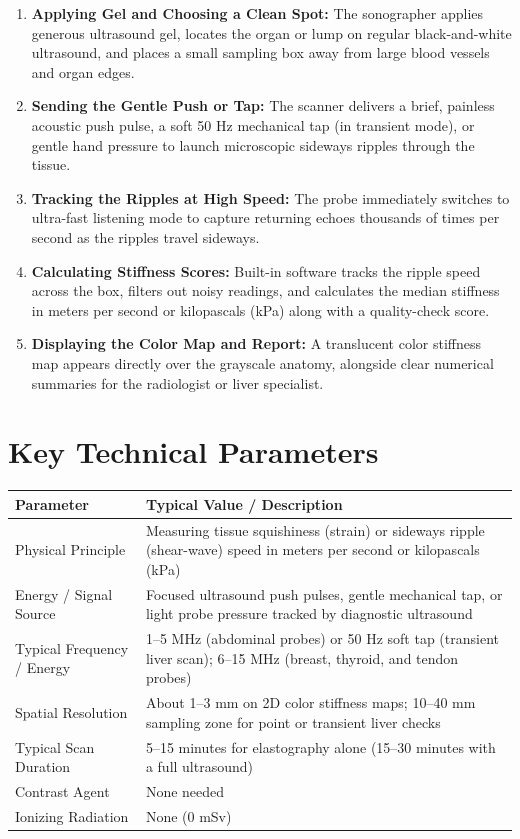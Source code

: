 \begin{enumerate}
    \item \textbf{Applying Gel and Choosing a Clean Spot:} The sonographer applies generous ultrasound gel, locates the organ or lump on regular black-and-white ultrasound, and places a small sampling box away from large blood vessels and organ edges.
    \item \textbf{Sending the Gentle Push or Tap:} The scanner delivers a brief, painless acoustic push pulse, a soft 50 Hz mechanical tap (in transient mode), or gentle hand pressure to launch microscopic sideways ripples through the tissue.
    \item \textbf{Tracking the Ripples at High Speed:} The probe immediately switches to ultra-fast listening mode to capture returning echoes thousands of times per second as the ripples travel sideways.
    \item \textbf{Calculating Stiffness Scores:} Built-in software tracks the ripple speed across the box, filters out noisy readings, and calculates the median stiffness in meters per second or kilopascals (kPa) along with a quality-check score.
    \item \textbf{Displaying the Color Map and Report:} A translucent color stiffness map appears directly over the grayscale anatomy, alongside clear numerical summaries for the radiologist or liver specialist.
\end{enumerate}

\section{Key Technical Parameters}

\noindent
\begin{tabularx}{\textwidth}{@{}l X@{}}
\toprule
\textbf{Parameter} & \textbf{Typical Value / Description} \\
\midrule
Physical Principle & Measuring tissue squishiness (strain) or sideways ripple (shear-wave) speed in meters per second or kilopascals (kPa) \\
Energy / Signal Source & Focused ultrasound push pulses, gentle mechanical tap, or light probe pressure tracked by diagnostic ultrasound \\
Typical Frequency / Energy & 1--5 MHz (abdominal probes) or 50 Hz soft tap (transient liver scan); 6--15 MHz (breast, thyroid, and tendon probes) \\
Spatial Resolution & About 1--3 mm on 2D color stiffness maps; 10--40 mm sampling zone for point or transient liver checks \\
Typical Scan Duration & 5--15 minutes for elastography alone (15--30 minutes with a full ultrasound) \\
Contrast Agent & None needed \\
Ionizing Radiation & None (0 mSv) \\
\bottomrule
\end{tabularx}

